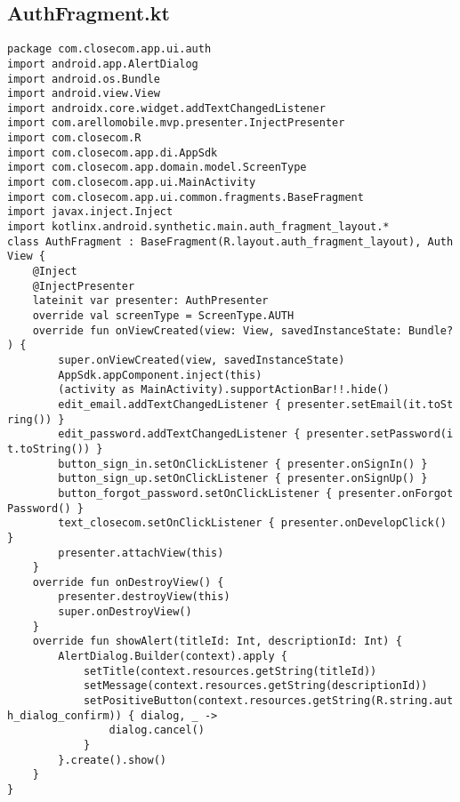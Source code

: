 \documentclass[listing]{espd}
\begin{document}
\subsection{AuthFragment.kt}
\begin{verbatim}
package com.closecom.app.ui.auth
import android.app.AlertDialog
import android.os.Bundle
import android.view.View
import androidx.core.widget.addTextChangedListener
import com.arellomobile.mvp.presenter.InjectPresenter
import com.closecom.R
import com.closecom.app.di.AppSdk
import com.closecom.app.domain.model.ScreenType
import com.closecom.app.ui.MainActivity
import com.closecom.app.ui.common.fragments.BaseFragment
import javax.inject.Inject
import kotlinx.android.synthetic.main.auth_fragment_layout.*
class AuthFragment : BaseFragment(R.layout.auth_fragment_layout), Auth
View {
    @Inject
    @InjectPresenter
    lateinit var presenter: AuthPresenter
    override val screenType = ScreenType.AUTH
    override fun onViewCreated(view: View, savedInstanceState: Bundle?
) {
        super.onViewCreated(view, savedInstanceState)
        AppSdk.appComponent.inject(this)
        (activity as MainActivity).supportActionBar!!.hide()
        edit_email.addTextChangedListener { presenter.setEmail(it.toSt
ring()) }
        edit_password.addTextChangedListener { presenter.setPassword(i
t.toString()) }
        button_sign_in.setOnClickListener { presenter.onSignIn() }
        button_sign_up.setOnClickListener { presenter.onSignUp() }
        button_forgot_password.setOnClickListener { presenter.onForgot
Password() }
        text_closecom.setOnClickListener { presenter.onDevelopClick() 
}
        presenter.attachView(this)
    }
    override fun onDestroyView() {
        presenter.destroyView(this)
        super.onDestroyView()
    }
    override fun showAlert(titleId: Int, descriptionId: Int) {
        AlertDialog.Builder(context).apply {
            setTitle(context.resources.getString(titleId))
            setMessage(context.resources.getString(descriptionId))
            setPositiveButton(context.resources.getString(R.string.aut
h_dialog_confirm)) { dialog, _ ->
                dialog.cancel()
            }
        }.create().show()
    }
}
\end{verbatim}
\end{document}
